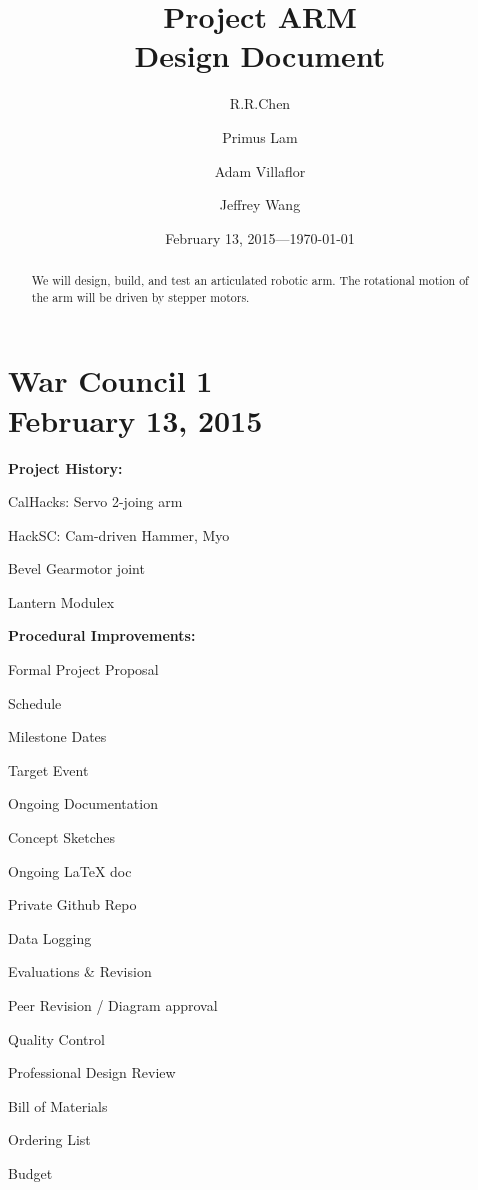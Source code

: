 \documentclass[11pt]{article}
\title{Project ARM\\Design Document}
\author{R.R.Chen \and Primus Lam \and Adam Villaflor \and Jeffrey Wang
}
\date{February 13, 2015---\today}
\begin{document}
\maketitle

\begin{abstract}
\noindent We will design, build, and test an articulated robotic arm. The rotational motion of the arm will be driven by stepper motors.
\end{abstract}

\newpage


\section{War Council 1 \\ February 13, 2015}

\noindent \textbf{Project History:}
\begin{compactitem}
	\item CalHacks: Servo 2-joing arm
	\item HackSC: Cam-driven Hammer, Myo
	\item Bevel Gearmotor joint
	\item Lantern Modulex
\end{compactitem}

\noindent \textbf{Procedural Improvements:}
\begin{compactitem}
	\item Formal Project Proposal
		\begin{compactitem}
		\item Schedule
		\item Milestone Dates
		\item Target Event
		\end{compactitem}
	\item Ongoing Documentation
		\begin{compactitem}
		\item Concept Sketches
		\item Ongoing LaTeX doc
		\item Private Github Repo
		\item Data Logging
		\end{compactitem}
	\item Evaluations \& Revision
		\begin{compactitem}
		\item Peer Revision / Diagram approval
		\item Quality Control
		\item Professional Design Review
		\end{compactitem}
	\item Bill of Materials
		\begin{compactitem}
		\item Ordering List
		\item Budget
		\end{compactitem}
\end{compactitem}
\end{document}
